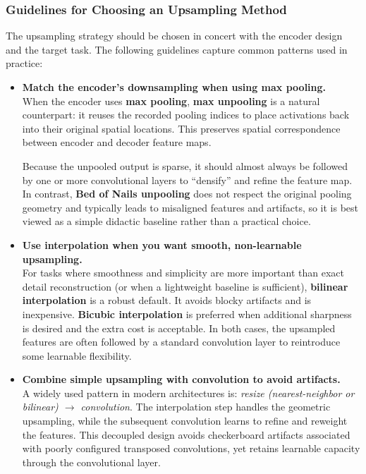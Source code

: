 \subsubsection{Guidelines for Choosing an Upsampling Method}

\noindent
The upsampling strategy should be chosen in concert with the encoder design and the target task. The following guidelines capture common patterns used in practice:

\begin{itemize}
	\item \textbf{Match the encoder’s downsampling when using max pooling.} \\
	When the encoder uses \textbf{max pooling}, \textbf{max unpooling} is a natural counterpart: it reuses the recorded pooling indices to place activations back into their original spatial locations. This preserves spatial correspondence between encoder and decoder feature maps. 
	
	\newpage
	
	Because the unpooled output is sparse, it should almost always be followed by one or more convolutional layers to “densify” and refine the feature map. In contrast, \textbf{Bed of Nails unpooling} does not respect the original pooling geometry and typically leads to misaligned features and artifacts, so it is best viewed as a simple didactic baseline rather than a practical choice.
	
	\item \textbf{Use interpolation when you want smooth, non-learnable upsampling.} \\
	For tasks where smoothness and simplicity are more important than exact detail reconstruction (or when a lightweight baseline is sufficient), \textbf{bilinear interpolation} is a robust default. It avoids blocky artifacts and is inexpensive. \textbf{Bicubic interpolation} is preferred when additional sharpness is desired and the extra cost is acceptable. In both cases, the upsampled features are often followed by a standard convolution layer to reintroduce some learnable flexibility.
	
	\item \textbf{Combine simple upsampling with convolution to avoid artifacts.} \\
	A widely used pattern in modern architectures is: \emph{resize (nearest-neighbor or bilinear) \(\rightarrow\) convolution}. The interpolation step handles the geometric upsampling, while the subsequent convolution learns to refine and reweight the features. This decoupled design avoids checkerboard artifacts associated with poorly configured transposed convolutions, yet retains learnable capacity through the convolutional layer.
	

\end{itemize}
